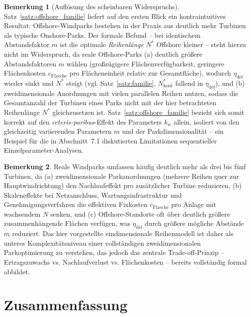 ﻿\documentclass[a4paper,12pt]{article}
\theoremstyle{definition}
\newtheorem{bemerkung}{Bemerkung}
\begin{document}
\begin{bemerkung}[Auflösung des scheinbaren Widerspruchs]
Satz~\ref{satz:offshore_familie} liefert auf den ersten Blick ein kontraintuitives Resultat: Offshore-Windparks bestehen in der Praxis aus deutlich mehr Turbinen als typische Onshore-Parks. Der formale Befund -- bei identischem Abstandsfaktor $m$ ist die optimale \emph{Reihenlänge} $N^*$ Offshore kleiner -- steht hierzu nicht im Widerspruch, da reale Offshore-Parks (a) deutlich größere Abstandsfaktoren $m$ wählen (großzügigere Flächenverfügbarkeit, geringere Flächenkosten $c_{\mathrm{Flaeche}}$ pro Flächeneinheit relativ zur Gesamtfläche), wodurch $\eta_{\mathrm{def}}$ wieder sinkt und $N^*$ steigt (vgl. Satz~\ref{satz:familie}, $N^*_{\mathrm{kont}}$ fallend in $\eta_{\mathrm{def}}$), und (b) zweidimensionale Anordnungen mit vielen parallelen Reihen nutzen, sodass die Gesamtanzahl der Turbinen eines Parks nicht mit der hier betrachteten Reihenlänge $N^*$ gleichzusetzen ist. Satz~\ref{satz:offshore_familie} bezieht sich somit korrekt auf den \emph{ceteris-paribus}-Effekt des Parameters $k_w$ allein, isoliert von den gleichzeitig variierenden Parametern $m$ und der Parkdimensionalität -- ein Beispiel für die in Abschnitt~7.1 diskutierten Limitationen sequentieller Einzelparameter-Analysen.
\end{bemerkung}

\begin{bemerkung}
Reale Windparks umfassen häufig deutlich mehr als drei bis fünf Turbinen, da (a) zweidimensionale Parkanordnungen (mehrere Reihen quer zur Hauptwindrichtung) den Nachlaufeffekt pro zusätzlicher Turbine reduzieren, (b) Skaleneffekte bei Netzanschluss, Wartungsinfrastruktur und Genehmigungsverfahren die effektiven Fixkosten $c_{\mathrm{Flaeche}}$ pro Anlage mit wachsendem $N$ senken, und (c) Offshore-Standorte oft über deutlich größere zusammenhängende Flächen verfügen, was $\eta_{\mathrm{def}}$ durch größere mögliche Abstände $m$ reduziert. Das hier vorgestellte eindimensionale Reihenmodell ist daher als unteres Komplexitätsniveau einer vollständigen zweidimensionalen Parkoptimierung zu verstehen, das jedoch das zentrale Trade-off-Prinzip -- Ertragszuwachs vs. Nachlaufverlust vs. Flächenkosten -- bereits vollständig formal abbildet.
\end{bemerkung}

\section{Zusammenfassung}
\end{document}
